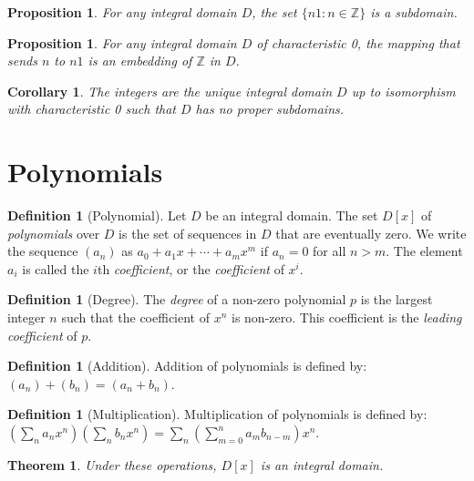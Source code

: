 \documentclass{article}
\newtheorem{proposition}[axiom]{Proposition}
\newtheorem{theorem}[axiom]{Theorem}
\newtheorem{corollary}{Corollary}[axiom]
\theoremstyle{definition}
\newtheorem{definition}[axiom]{Definition}
\begin{document}
    \begin{proposition}
        For any integral domain $D$, the set $\{ n1 : n \in \mathbb{Z} \}$ is a subdomain.
    \end{proposition}

    \begin{proposition}
        For any integral domain $D$ of characteristic 0, the mapping that sends $n$ to $n1$ is an
        embedding of $\mathbb{Z}$ in $D$.
    \end{proposition}

    \begin{corollary}
        The integers are the unique integral domain $D$ up to isomorphism with characteristic 0 such that
        $D$ has no proper subdomains.
    \end{corollary}

    \section{Polynomials}

    \begin{definition}[Polynomial]
        Let $D$ be an integral domain. The set $D[x]$ of \emph{polynomials} over $D$ is the set of sequences
        in $D$ that are eventually zero. We write the sequence $(a_n)$ as 
        $a_0 + a_1 x + \cdots +
        a_m x^m$ if $a_n = 0$ for all $n > m$. The element $a_i$ is called the $i$th \emph{coefficient}, or the \emph{coefficient} of
        $x^i$.
    \end{definition}

    \begin{definition}[Degree]
        The \emph{degree} of a non-zero polynomial $p$ is the largest integer $n$ such that the coefficient of
        $x^n$ is non-zero. This coefficient is the \emph{leading coefficient} of $p$.
    \end{definition}

    \begin{definition}[Addition]
        Addition of polynomials is defined by: $(a_n) + (b_n) = (a_n + b_n)$.
    \end{definition}

    \begin{definition}[Multiplication]
        Multiplication of polynomials is defined by: $(\sum_n a_n x^n) (\sum_n b_n x^n) = \sum_n (\sum_{m=0}^n a_m b_{n-m}) x^n$.
    \end{definition}

    \begin{theorem}
        Under these operations, $D[x]$ is an integral domain.
    \end{theorem}
\end{document}
